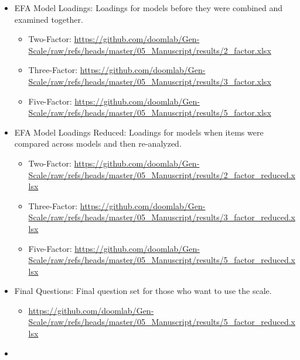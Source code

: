 \documentclass[
  english,
  man]{apa6}
\providecommand{\tightlist}{%
  \setlength{\itemsep}{0pt}\setlength{\parskip}{0pt}}
\begin{document}
\begin{itemize}
\tightlist
\item
  EFA Model Loadings: Loadings for models before they were combined and examined together.

  \begin{itemize}
  \tightlist
  \item
    Two-Factor: \url{https://github.com/doomlab/Gen-Scale/raw/refs/heads/master/05_Manuscript/results/2_factor.xlsx}
  \item
    Three-Factor: \url{https://github.com/doomlab/Gen-Scale/raw/refs/heads/master/05_Manuscript/results/3_factor.xlsx}
  \item
    Five-Factor: \url{https://github.com/doomlab/Gen-Scale/raw/refs/heads/master/05_Manuscript/results/5_factor.xlsx}
  \end{itemize}
\item
  EFA Model Loadings Reduced: Loadings for models when items were compared across models and then re-analyzed.

  \begin{itemize}
  \tightlist
  \item
    Two-Factor: \url{https://github.com/doomlab/Gen-Scale/raw/refs/heads/master/05_Manuscript/results/2_factor_reduced.xlsx}
  \item
    Three-Factor: \url{https://github.com/doomlab/Gen-Scale/raw/refs/heads/master/05_Manuscript/results/3_factor_reduced.xlsx}
  \item
    Five-Factor: \url{https://github.com/doomlab/Gen-Scale/raw/refs/heads/master/05_Manuscript/results/5_factor_reduced.xlsx}
  \end{itemize}
\item
  Final Questions: Final question set for those who want to use the scale.

  \begin{itemize}
  \tightlist
  \item
    \url{https://github.com/doomlab/Gen-Scale/raw/refs/heads/master/05_Manuscript/results/5_factor_reduced.xlsx}
  \end{itemize}
\item
\end{itemize}
\end{document}
